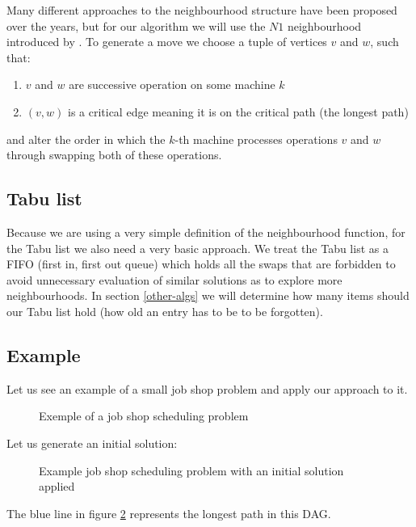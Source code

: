 \documentclass[14pt]{article}
\begin{document}
Many different approaches to the neighbourhood structure have been proposed over the years, but for our algorithm we will use the $N1$ neighbourhood introduced by \citet[section 3.3]{laarhoven}.
To generate a move we choose a tuple of vertices $v$ and $w$, such that:
\begin{enumerate}
  \item $v$ and $w$ are successive operation on some machine $k$
  \item $(v,w)$ is a critical edge meaning it is on the critical path (the longest path)
\end{enumerate}
and alter the order in which the $k$-th machine processes operations $v$ and $w$ through swapping both of these operations.

\subsection{Tabu list}

Because we are using a very simple definition of the neighbourhood function, for the Tabu list we also need a very basic approach. We treat the Tabu list as a FIFO (first in, first out queue) which holds all the swaps that are forbidden to avoid unnecessary evaluation of similar solutions as to explore more neighbourhoods. In section \ref{other-algs} we will determine how many items should our Tabu list hold (how old an entry has to be to be forgotten).

\subsection{Example}

Let us see an example of a small job shop problem and apply our approach to it.

\begin{figure}[H]
  \centering
  \def\svgwidth{0.5\columnwidth}
  
  \caption{Exemple of a job shop scheduling problem}
  \label{ts-sol-1}
\end{figure}

Let us generate an initial solution:

\begin{figure}[H]
  \centering
  \def\svgwidth{0.5\columnwidth}
  
  \caption{Example job shop scheduling problem with an initial solution applied}
  \label{ts-sol-2}
\end{figure}

The blue line in figure \ref{ts-sol-2} represents the longest path in this DAG.
\end{document}
